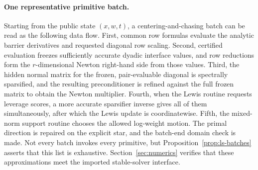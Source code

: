 \documentclass[11pt]{article}
\theoremstyle{definition}
\begin{document}
\paragraph{One representative primitive batch.}
Starting from the public state $(x,w,t)$, a centering-and-chasing batch
can be read as the following data flow.  First, common row formulas evaluate
the analytic barrier derivatives and requested diagonal row scaling.  Second,
certified evaluation freezes sufficiently accurate dyadic interface values, and row
reductions form the $r$-dimensional Newton right-hand side from those values.
Third, the hidden normal matrix for the frozen, pair-evaluable diagonal is
spectrally sparsified, and the resulting preconditioner is refined against the
full frozen matrix to obtain the Newton multiplier.  Fourth, when
the Lewis routine requests leverage scores, a more accurate sparsifier
inverse gives all of them simultaneously, after which the Lewis update is
coordinatewise.  Fifth, the mixed-norm support routine chooses the allowed
log-weight motion.  The primal direction is repaired on the explicit star,
and the batch-end domain check is made.  Not every batch invokes every
primitive, but Proposition~\ref{prop:ls-batches} asserts that this list is
exhaustive.  Section~\ref{sec:numerics} verifies that these approximations
meet the imported stable-solver interface.
\end{document}
